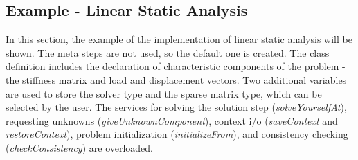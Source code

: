\documentclass[12pt,draft]{article}
\newcommand{\service}[1]{{\em #1}}
\begin{document}
\subsection{Example - Linear Static Analysis}
\label{Engngmodelexample}
In this section, the example of the implementation of linear static
analysis will be shown. The meta steps are not used, so the default
one is created. 
The class definition includes the declaration of characteristic
components of the problem - the stiffness matrix and load and
displacement vectors. Two additional variables are used to store the
solver type and the sparse matrix type, which can be selected by the user.
The services for solving the solution step (\service{solveYourselfAt}), 
requesting unknowns (\service{giveUnknownComponent}), context i/o
(\service{saveContext} and \service{restoreContext}), problem
initialization (\service{initializeFrom}), and  consistency checking
(\service{checkConsistency}) are overloaded.
\end{document}
